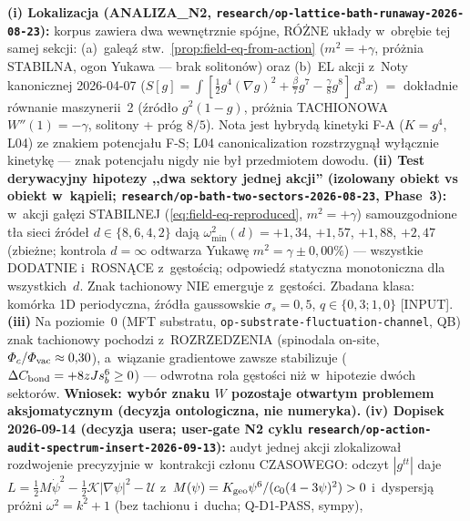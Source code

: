 \begin{remark}%
\label{rem:W-sign-axiomatic}
\textbf{(i) Lokalizacja (ANALIZA\_N2,
\texttt{research/op-lattice-bath-runaway-2026-08-23}):}
korpus zawiera dwa wewn\k{e}trznie sp\'ojne, R\'O\.ZNE uk\l{}ady
w~obr\k{e}bie tej samej sekcji: (a)~gale\k{a}\'z
stw.~\ref{prop:field-eq-from-action} ($m^2=+\gamma$, pr\'o\.znia
STABILNA, ogon Yukawa --- brak soliton\'ow) oraz (b)~EL akcji
z~Noty kanonicznej 2026-04-07
($S[g]=\int[\tfrac12 g^4(\nabla g)^2+\tfrac{\beta}{7}g^7
-\tfrac{\gamma}{8}g^8]\,d^3x$) $=$ dok\l{}adnie r\'ownanie
maszynerii~2 (\'zr\'od\l{}o $g^2(1-g)$, pr\'o\.znia TACHIONOWA
$W''(1)=-\gamma$, solitony + pr\'og $8/5$). Nota jest hybryd\k{a}
kinetyki F-A ($K=g^4$, L04) ze znakiem potencja\l{}u F-S;
L04 canonicalization rozstrzygn\k{a}\l{} wy\l{}\k{a}cznie kinetyk\k{e}
--- znak potencja\l{}u nigdy nie by\l{} przedmiotem dowodu.
\textbf{(ii) Test derywacyjny hipotezy ,,dwa sektory jednej akcji''
(izolowany obiekt vs obiekt w~k\k{a}pieli;
\texttt{research/op-bath-two-sectors-2026-08-23}, Phase~3):}
w~akcji ga\l{}\k{e}zi STABILNEJ (\ref{eq:field-eq-reproduced},
$m^2=+\gamma$) samouzgodnione t\l{}a sieci \'zr\'ode\l{}
$d\in\{8,6,4,2\}$ daj\k{a} $\omega^2_{\min}(d)=+1{,}34$, $+1{,}57$,
$+1{,}88$, $+2{,}47$ (zbie\.zne; kontrola $d=\infty$ odtwarza
Yukaw\k{e} $m^2=\gamma\pm0{,}00\%$) --- wszystkie DODATNIE
i~ROSN\k{A}CE z~g\k{e}sto\'sci\k{a}; odpowied\'z statyczna
monotoniczna dla wszystkich~$d$. Znak tachionowy NIE emerguje
z~g\k{e}sto\'sci. Zbadana klasa: kom\'orka 1D periodyczna,
\'zr\'od\l{}a gaussowskie $\sigma_s=0{,}5$, $q\in\{0{,}3;1{,}0\}$
[INPUT]. \textbf{(iii)} Na poziomie~0 (MFT substratu,
\texttt{op-substrate-fluctuation-channel}, QB) znak tachionowy
pochodzi z~ROZRZEDZENIA (spinodala on-site,
$\Phi_c/\Phi_{\rm vac}\approx0{,}30$), a~wi\k{a}zanie gradientowe
zawsze stabilizuje ($\Delta C_{\rm bond}=+8zJs_b^6\ge0$) ---
odwrotna rola g\k{e}sto\'sci ni\.z w~hipotezie dw\'och sektor\'ow.
\textbf{Wniosek: wyb\'or znaku $W$ pozostaje otwartym problemem
aksjomatycznym (decyzja ontologiczna, nie numeryka).}
\textbf{(iv) Dopisek 2026-09-14 (decyzja usera; user-gate N2 cyklu
\texttt{research/op-action-audit-spectrum-insert-2026-09-13}):}
audyt jednej akcji zlokalizowa\l{} rozdwojenie precyzyjnie
w~kontrakcji cz\l{}onu CZASOWEGO: odczyt $|g^{tt}|$ daje
$L=\tfrac12 M\dot\psi^2-\tfrac12\mathcal{K}|\nabla\psi|^2-\mathcal{U}$
z~$M(\psi)=K_{\rm geo}\psi^6/(c_0(4-3\psi)^2)>0$ i~dyspersj\k{a}
pr\'o\.zni $\omega^2=k^2+1$ (bez tachionu i~ducha; Q-D1-PASS, sympy),

\end{remark}
